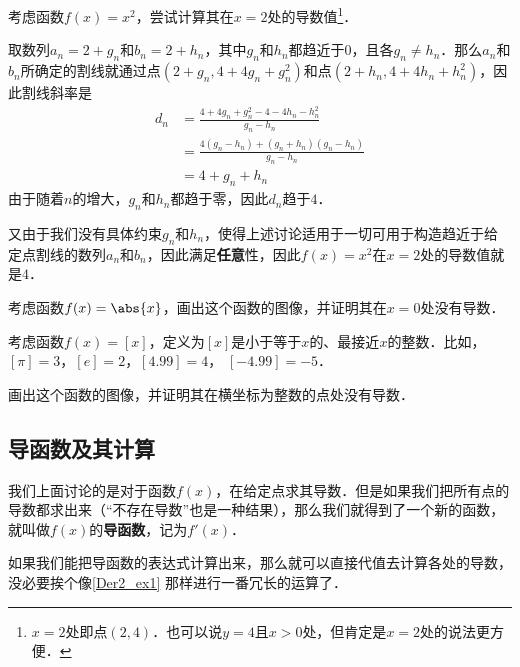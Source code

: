 \begin{example}{}\label{Der2_ex1}
考虑函数$f(x)=x^2$，尝试计算其在$x=2$处的导数值\footnote{$x=2$处即点$(2, 4)$．也可以说$y=4$且$x>0$处，但肯定是$x=2$处的说法更方便．}．

取数列$a_n=2+g_n$和$b_n=2+h_n$，其中$g_n$和$h_n$都趋近于$0$，且各$g_n\not=h_n$．那么$a_n$和$b_n$所确定的割线就通过点$(2+g_n, 4+4g_n+g_n^2)$和点$(2+h_n, 4+4h_n+h_n^2)$，因此割线斜率是
\begin{equation}
\begin{aligned}
d_n&=\frac{4+4g_n+g_n^2-4-4h_n-h_n^2}{g_n-h_n}\\
&=\frac{4(g_n-h_n)+(g_n+h_n)(g_n-h_n)}{g_n-h_n}\\
&=4+g_n+h_n
\end{aligned}
\end{equation}
由于随着$n$的增大，$g_n$和$h_n$都趋于零，因此$d_n$趋于$4$．

又由于我们没有具体约束$g_n$和$h_n$，使得上述讨论适用于一切可用于构造趋近于给定点割线的数列$a_n$和$b_n$，因此满足\textbf{任意}性，因此$f(x)=x^2$在$x=2$处的导数值就是$4$．
\end{example}

\begin{exercise}{}
考虑函数$f(x)=\abs{x}$，画出这个函数的图像，并证明其在$x=0$处没有导数．
\end{exercise}

\begin{exercise}{}\label{Der2_exe1}
考虑函数$f(x)=[x]$，定义为$[x]$是小于等于$x$的、最接近$x$的整数．比如，$[\pi]=3$，$[e]=2$，$[4.99]=4$， $[-4.99]=-5$．

画出这个函数的图像，并证明其在横坐标为整数的点处没有导数．
\end{exercise}








\subsection{导函数及其计算}

我们上面讨论的是对于函数$f(x)$，在给定点求其导数．但是如果我们把所有点的导数都求出来（“不存在导数”也是一种结果），那么我们就得到了一个新的函数，就叫做$f(x)$的\textbf{导函数}，记为$f'(x)$．

如果我们能把导函数的表达式计算出来，那么就可以直接代值去计算各处的导数，没必要挨个像\autoref{Der2_ex1} 那样进行一番冗长的运算了．



